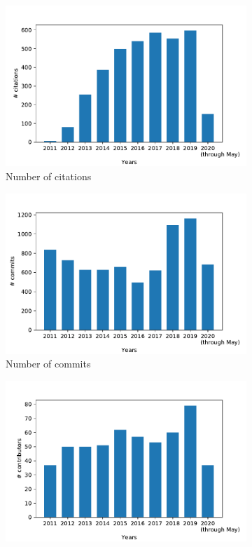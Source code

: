 \begin{figure}
    \centering
    \begin{subfigure}{0.28\linewidth}
      \centering
      \includegraphics[width=\linewidth]{fig/gem5_citations}
      \caption{Number of citations}
      \label{fig:citations}
    \end{subfigure}
    \begin{subfigure}{0.28\linewidth}
      \centering
      \includegraphics[width=\linewidth]{fig/gem5_commits}
      \caption{Number of commits}
      \label{fig:commits}
    \end{subfigure}
    \begin{subfigure}{0.28\linewidth}
      \centering
      \includegraphics[width=\linewidth]{fig/gem5_contributors}

\end{subfigure}
\end{figure}
